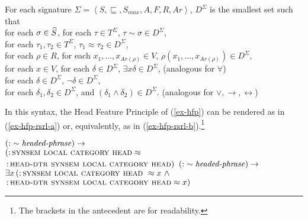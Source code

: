 \documentclass[output=paper,biblatex,babelshorthands,newtxmath,draftmode,colorlinks,citecolor=brown]{langscibook}
\begin{document}
{\begin{mydef}
  For each signature $\Sigma=\left<S,\sqsubseteq,S_{max},A,F,R,Ar\right>$,
  $D^{\Sigma}$ is the smallest set such that\\
  for each $\sigma\in\widehat{S}$, for each $\tau\in T^{\Sigma}$,
  $\tau\sim\sigma\in D^{\Sigma}$,\\
  for each $\tau_1, \tau_2\in T^{\Sigma}$, $\tau_1 \approx \tau_2 \in D^{\Sigma}$,\\
  for each $\rho\in R$, for each $x_1, \ldots, x_{Ar(\rho)}\in V$,
  $\rho(x_1,\ldots,x_{Ar(\rho)})\in D^{\Sigma}$,\\
  for each $x\in V$, for each $\delta\in D^{\Sigma}$,
  $\exists x\delta\in D^{\Sigma}$, \hfill (analogous for $\forall$)\\
  for each $\delta\in D^{\Sigma}$, $\neg\delta\in D^{\Sigma}$,\\
  for each $\delta_1,\delta_2\in D^{\Sigma}$, and
  $\left(\delta_1\land\delta_2\right) \in D^{\Sigma}$.
  \hfill (analogous for $\lor,\rightarrow,\leftrightarrow$)
\end{mydef}

In this syntax, the Head Feature Principle of (\ref{ex-hfp}) can be
rendered as in (\ref{ex-hfp-rsrl-a}) or, equivalently, as in
(\ref{ex-hfp-rsrl-b}).\footnote{The brackets in the antecedent are
for readability.}

\begin{exe}
  \ex
  \begin{xlist}
  \ex\label{ex-hfp-rsrl-a}
  $\left(\operatorname{:}\sim\mbox{{\normalfont\itshape headed-phrase\/}}\right)\rightarrow$\\ %
  $\left(\operatorname{:}\textsc{synsem local category head}\approx\right.$\\
 \hspace*{.1em} $\left.\operatorname{:}\textsc{head-dtr synsem local category head}\right)$
  \ex\label{ex-hfp-rsrl-b}
   $\left(\operatorname{:}\sim\mbox{{\normalfont\itshape headed-phrase\/}}\right)\rightarrow$\\ %
  $\exists x\left(\operatorname{:}\textsc{synsem local category head}~\approx x\ \wedge\right.$\\
\hspace*{1.2em}  $\left.\operatorname{:}\textsc{head-dtr synsem local category head}\approx x\right)$
  \end{xlist}
\end{exe}

}
\end{document}
